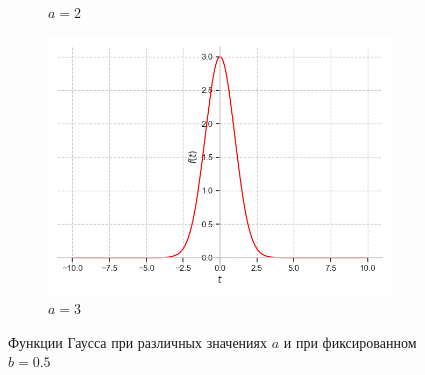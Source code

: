 \documentclass[a4paper, 16pt]{article}
\begin{document}
\begin{figure}[htbp]
\begin{subfigure}{0.3\textwidth}
            \caption{$a=2$}
            \label{fig:gauseq_2}
        \end{subfigure}
        \hfill
        \begin{subfigure}{0.3\textwidth}
            \centering
            \includegraphics[width=\linewidth]{gauseq_a=3_b=zp5.png}
            \caption{$a=3$}
            \label{fig:gauseq_3}
        \end{subfigure}
        \caption{Функции Гаусса при различных значениях $a$ и при фиксированном $b=0.5$}
        \label{fig:gauseqs}
    \end{figure}
\end{document}
